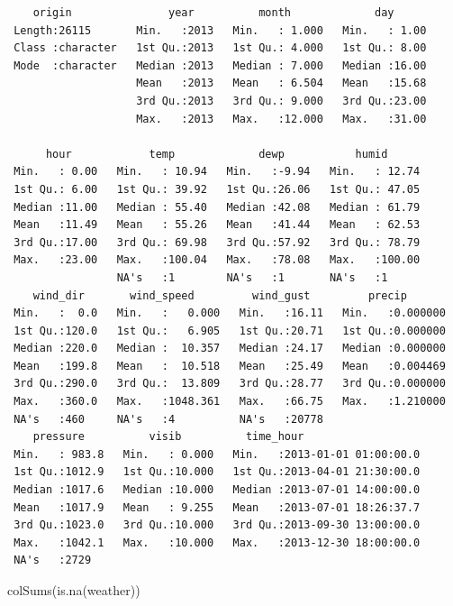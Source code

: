 \documentclass[
  10pt,
  letterpaper,
  DIV=11,
  numbers=noendperiod]{scrartcl}
\newenvironment{Shaded}{\begin{snugshade}}{\end{snugshade}}
\newcommand{\FunctionTok}[1]{\textcolor[rgb]{0.28,0.35,0.67}{#1}}
\newcommand{\NormalTok}[1]{\textcolor[rgb]{0.00,0.23,0.31}{#1}}
\begin{document}
\begin{verbatim}
    origin               year          month             day       
 Length:26115       Min.   :2013   Min.   : 1.000   Min.   : 1.00  
 Class :character   1st Qu.:2013   1st Qu.: 4.000   1st Qu.: 8.00  
 Mode  :character   Median :2013   Median : 7.000   Median :16.00  
                    Mean   :2013   Mean   : 6.504   Mean   :15.68  
                    3rd Qu.:2013   3rd Qu.: 9.000   3rd Qu.:23.00  
                    Max.   :2013   Max.   :12.000   Max.   :31.00  
                                                                   
      hour            temp             dewp           humid       
 Min.   : 0.00   Min.   : 10.94   Min.   :-9.94   Min.   : 12.74  
 1st Qu.: 6.00   1st Qu.: 39.92   1st Qu.:26.06   1st Qu.: 47.05  
 Median :11.00   Median : 55.40   Median :42.08   Median : 61.79  
 Mean   :11.49   Mean   : 55.26   Mean   :41.44   Mean   : 62.53  
 3rd Qu.:17.00   3rd Qu.: 69.98   3rd Qu.:57.92   3rd Qu.: 78.79  
 Max.   :23.00   Max.   :100.04   Max.   :78.08   Max.   :100.00  
                 NA's   :1        NA's   :1       NA's   :1       
    wind_dir       wind_speed         wind_gust         precip        
 Min.   :  0.0   Min.   :   0.000   Min.   :16.11   Min.   :0.000000  
 1st Qu.:120.0   1st Qu.:   6.905   1st Qu.:20.71   1st Qu.:0.000000  
 Median :220.0   Median :  10.357   Median :24.17   Median :0.000000  
 Mean   :199.8   Mean   :  10.518   Mean   :25.49   Mean   :0.004469  
 3rd Qu.:290.0   3rd Qu.:  13.809   3rd Qu.:28.77   3rd Qu.:0.000000  
 Max.   :360.0   Max.   :1048.361   Max.   :66.75   Max.   :1.210000  
 NA's   :460     NA's   :4          NA's   :20778                     
    pressure          visib          time_hour                    
 Min.   : 983.8   Min.   : 0.000   Min.   :2013-01-01 01:00:00.0  
 1st Qu.:1012.9   1st Qu.:10.000   1st Qu.:2013-04-01 21:30:00.0  
 Median :1017.6   Median :10.000   Median :2013-07-01 14:00:00.0  
 Mean   :1017.9   Mean   : 9.255   Mean   :2013-07-01 18:26:37.7  
 3rd Qu.:1023.0   3rd Qu.:10.000   3rd Qu.:2013-09-30 13:00:00.0  
 Max.   :1042.1   Max.   :10.000   Max.   :2013-12-30 18:00:00.0  
 NA's   :2729                                                     
\end{verbatim}

\begin{Shaded}
\begin{Highlighting}[numbers=left,,]
\FunctionTok{colSums}\NormalTok{(}\FunctionTok{is.na}\NormalTok{(weather))}
\end{Highlighting}
\end{Shaded}
\end{document}
